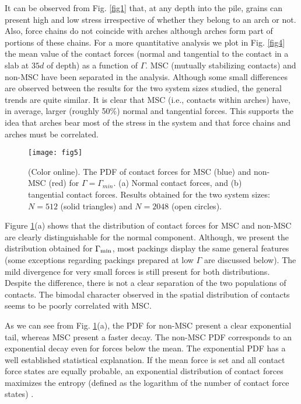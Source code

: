 It can be observed from Fig. \ref{fig1} that, at any depth into the pile, grains can present high and low stress irrespective of whether they belong to an arch or not. Also, force chains do not coincide with arches although arches form part of portions of these chains. For a more quantitative analysis we plot in Fig. \ref{fig4} the mean value of the contact forces (normal and tangential to the contact in a slab at $35 d$ of depth) as a function of $\Gamma$. MSC (mutually stabilizing contacts) and non-MSC have been separated in the analysis. Although some small differences are observed between the results for the two system sizes studied, the general trends are quite similar. It is clear that MSC (i.e., contacts within arches) have, in average, larger (roughly 50\%) normal and tangential forces. This supports the idea that arches bear most of the stress in the system and that force chains and arches must be correlated. 

\begin{figure}[t]
\centering
\texttt{[image: fig5]}
\caption {(Color online). The PDF of contact forces for MSC (blue) and non-MSC (red) for $\Gamma=\Gamma_{min}$. (a) Normal contact forces, and (b) tangential contact forces. Results obtained for the two system sizes: $N=512$ (solid triangles) and $N=2048$ (open circles).}
\label{fig5}
\end{figure}

Figure \ref{fig5}(a) shows that the distribution of contact forces for MSC and non-MSC are clearly distinguishable for the normal component. Although, we present the distribution obtained for $\Gamma_{\rm{min}}$, most packings display the same general features (some exceptions regarding packings prepared at low $\Gamma$ are discussed below). The mild divergence for very small forces is still present for both distributions. Despite the difference, there is not a clear separation of the two populations of contacts. The bimodal character observed in the spatial distribution of contacts seems to be poorly correlated with MSC.

As we can see from Fig. \ref{fig5}(a), the PDF for non-MSC present a clear exponential tail, whereas MSC present a faster decay. The non-MSC PDF corresponds to an exponential decay even for forces below the mean. The exponential PDF has a well established statistical explanation. If the mean force is set and all contact force states are equally probable, an exponential distribution of contact forces maximizes the entropy (defined as the logarithm of the number of contact force states) \cite{edwards2,evesque}. 

